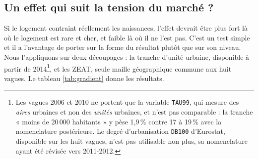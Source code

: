 \documentclass[12pt,a4paper]{article}
\begin{document}
\subsection{Un effet qui suit la tension du marché ?}

Si le logement contraint réellement les naissances, l'effet devrait être plus fort là où le logement est rare et cher, et faible là où il ne l'est pas. C'est un test simple et il a l'avantage de porter sur la forme du résultat plutôt que sur son niveau. Nous l'appliquons sur deux découpages : la tranche d'unité urbaine, disponible à partir de 2014\footnote{Les vagues 2006 et 2010 ne portent que la variable \texttt{TAU99}, qui mesure des \textit{aires} urbaines et non des \textit{unités} urbaines, et n'est pas comparable : la tranche « moins de 20\,000 habitants » y pèse 1,9\,\% contre 17 à 19\,\% avec la nomenclature postérieure. Le degré d'urbanisation \texttt{DB100} d'Eurostat, disponible sur les huit vagues, n'est pas utilisable non plus, sa nomenclature ayant été révisée vers 2011-2012.}, et les ZEAT, seule maille géographique commune aux huit vagues. Le tableau \ref{tab:gradient} donne les résultats. \\

\bigskip
\end{document}
